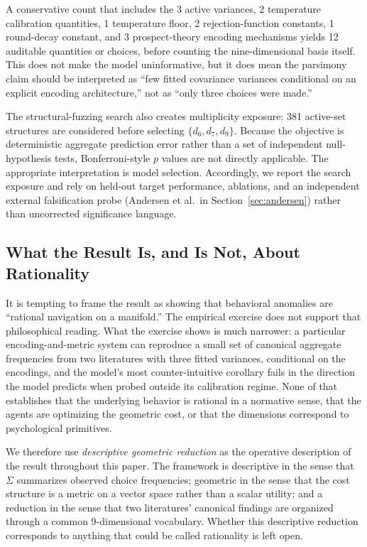 \documentclass[journal]{IEEEtran}
\begin{document}
A conservative count that includes the 3 active variances, 2 temperature calibration quantities, 1 temperature floor, 2 rejection-function constants, 1 round-decay constant, and 3 prospect-theory encoding mechanisms yields 12 auditable quantities or choices, before counting the nine-dimensional basis itself.
This does not make the model uninformative, but it does mean the parsimony claim should be interpreted as ``few fitted covariance variances conditional on an explicit encoding architecture,'' not as ``only three choices were made.''

The structural-fuzzing search also creates multiplicity exposure: 381 active-set structures are considered before selecting $\{d_6,d_7,d_9\}$.
Because the objective is deterministic aggregate prediction error rather than a set of independent null-hypothesis tests, Bonferroni-style $p$ values are not directly applicable.
The appropriate interpretation is model selection.
Accordingly, we report the search exposure and rely on held-out target performance, ablations, and an independent external falsification probe (Andersen et al.\ in Section~\ref{sec:andersen}) rather than uncorrected significance language.

\subsection{What the Result Is, and Is Not, About Rationality}
\label{sec:not-rationality}

It is tempting to frame the result as showing that behavioral anomalies are ``rational navigation on a manifold.''
The empirical exercise does not support that philosophical reading.
What the exercise shows is much narrower: a particular encoding-and-metric system can reproduce a small set of canonical aggregate frequencies from two literatures with three fitted variances, conditional on the encodings, and the model's most counter-intuitive corollary fails in the direction the model predicts when probed outside its calibration regime.
None of that establishes that the underlying behavior is rational in a normative sense, that the agents are optimizing the geometric cost, or that the dimensions correspond to psychological primitives.

We therefore use \emph{descriptive geometric reduction} as the operative description of the result throughout this paper.
The framework is descriptive in the sense that $\Sigma$ summarizes observed choice frequencies; geometric in the sense that the cost structure is a metric on a vector space rather than a scalar utility; and a reduction in the sense that two literatures' canonical findings are organized through a common 9-dimensional vocabulary.
Whether this descriptive reduction corresponds to anything that could be called rationality is left open.
\end{document}
